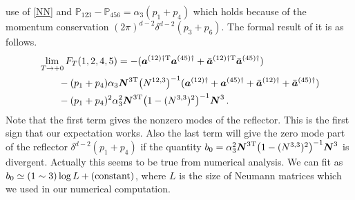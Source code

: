 \documentclass[12pt]{article}
\begin{document}
use of \eqref{NN} and 
${\mathbb P}_{123}-{\mathbb P}_{456}=\alpha_3(p_1+p_4)$
which holds because of the momentum conservation
$(2\pi)^{d-2}\delta^{d-2}(p_3+p_6)$.
The formal result of it is as follows.
\begin{align}
&\lim_{T\rightarrow +0}F_T(1,2,4,5)=
-(\boldsymbol{a}^{(12)\dagger{\rm T}}\boldsymbol{a}^{(45)\dagger}
+\bar{\boldsymbol{a}}^{(12)\dagger{\rm T}}
\bar{\boldsymbol{a}}^{(45)\dagger})\nonumber\\
&\qquad-(p_1+p_4)\alpha_3
\boldsymbol{N}^{3{\rm T}}\bigl(N^{12,3}\bigr)^{-1}
(\boldsymbol{a}^{(12)\dagger}
+\boldsymbol{a}^{(45)\dagger}
+\bar{\boldsymbol{a}}^{(12)\dagger}
+\bar{\boldsymbol{a}}^{(45)\dagger})\nonumber\\
&\qquad-(p_1+p_4)^2\alpha_3^2\boldsymbol{N}^{3{\rm T}}
\bigl(1-(N^{3,3})^2\bigr)^{-1}
\boldsymbol{N}^{3}\,.
\label{T0}
\end{align}
Note that the first term gives the nonzero modes of the
reflector. 
This is the first sign that our expectation works. 
Also the last term will give the zero mode part of the reflector
$\delta^{d-2}(p_1+p_4)$ if the quantity $b_0=\alpha_3^2
\boldsymbol{N}^{3{\rm T}}\bigl(1-(N^{3,3})^2\bigr)^{-1}
\boldsymbol{N}^{3}$ is divergent.
Actually this seems to be true from numerical analysis.
We can fit as $b_0\simeq(1\sim 3)\log L+({\rm constant})$, where $L$
is the size of Neumann matrices which we used in our numerical
computation.
\end{document}
